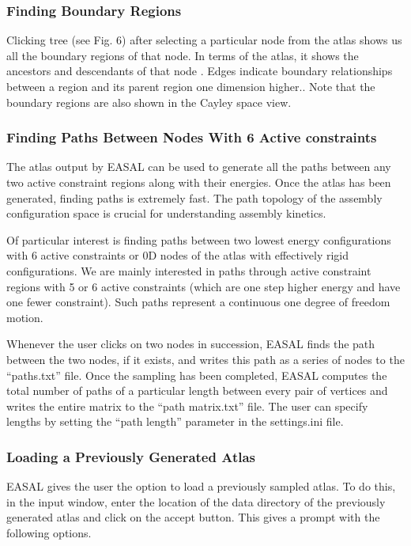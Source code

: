 \documentclass[10pt]{article}
\begin{document}
\subsubsection{Finding Boundary Regions}
Clicking tree (see Fig. 6) after selecting a particular node from the atlas shows us all the boundary regions
of that node. In terms of the atlas, it shows the ancestors and descendants of that node . Edges indicate boundary
relationships between a region and its parent region one dimension higher.. Note that
the boundary regions are also shown in the Cayley space view.



\subsubsection{Finding Paths Between Nodes With 6 Active constraints}
The atlas output by EASAL can be used to generate all the paths between any two 
active constraint regions along with their energies. Once the atlas has been 
generated, finding paths is extremely fast. The path topology of the assembly configuration space is crucial for understanding assembly kinetics.

Of particular interest is finding paths between two lowest energy configurations with 6 active constraints
or 0D nodes of the atlas with effectively rigid configurations. We are mainly interested in paths through
active constraint regions with 5 or 6 active constraints (which are one step higher energy and have one fewer
constraint). Such paths represent a continuous one degree of freedom motion.

Whenever the user clicks on two nodes in succession, EASAL finds the path between the two nodes, if it
exists, and writes this path as a series of nodes to the “paths.txt” file. Once the sampling has been completed,
EASAL computes the total number of paths of a particular length between every pair of vertices and writes
the entire matrix to the “path matrix.txt” file. The user can specify lengths by setting the “path length”
parameter in the settings.ini file.


\subsubsection{Loading a Previously Generated Atlas}
EASAL gives the user the option to load a previously sampled atlas. To do this, in the input window, enter
the location of the data directory of the previously generated atlas and click on the accept button. This
gives a prompt with the following options.
\end{document}
